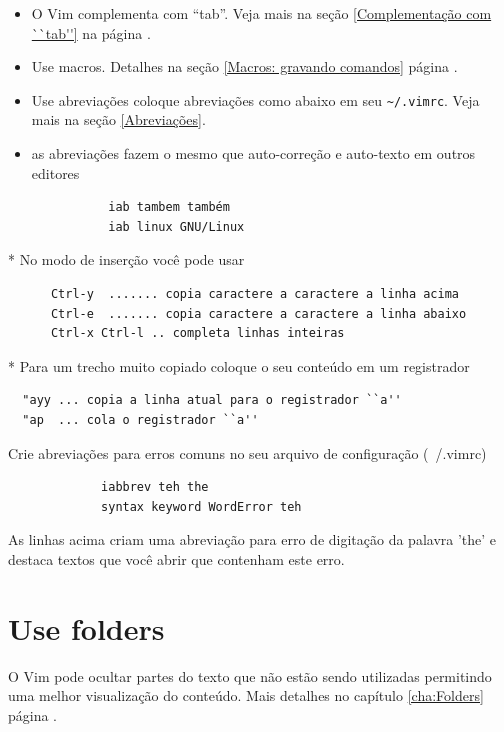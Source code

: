 \documentclass[10pt,a4paper,openany]{book}
\begin{document}
\begin{itemize}
\item O Vim complementa com ``tab''. Veja mais na seção \ref{Complementação com ``tab''} na página \pageref{Complementação com ``tab''}.
\item Use macros. Detalhes na seção \ref{Macros: gravando comandos}
página \pageref{Macros: gravando comandos}.
\item Use abreviações coloque abreviações como abaixo em seu \verb|~/.vimrc|. Veja mais na seção \ref{Abreviações}.
\item as abreviações fazem o mesmo que auto-correção e auto-texto em outros editores
\end{itemize}

\begin{verbatim}
			  iab tambem também
			  iab linux GNU/Linux
\end{verbatim}



* No modo de inserção você pode usar

\begin{verbatim}
	  Ctrl-y  ....... copia caractere a caractere a linha acima
	  Ctrl-e  ....... copia caractere a caractere a linha abaixo
	  Ctrl-x Ctrl-l .. completa linhas inteiras
\end{verbatim}

* Para um trecho muito copiado coloque o seu conteúdo em um registrador

\begin{verbatim}
  "ayy ... copia a linha atual para o registrador ``a''
  "ap  ... cola o registrador ``a''
\end{verbatim}

Crie abreviações para erros comuns no seu arquivo de configuração (~/.vimrc)

\begin{verbatim}
			 iabbrev teh the
			 syntax keyword WordError teh
\end{verbatim}

As linhas acima criam uma abreviação para erro de digitação da palavra 'the'
e destaca textos que você abrir que contenham este erro.

\section{Use folders}\label{sec:Use folders}

O Vim pode ocultar partes do texto que não estão sendo utilizadas permitindo
uma melhor visualização do conteúdo. Mais detalhes no capítulo
\ref{cha:Folders} página \pageref{cha:Folders}.
\end{document}
